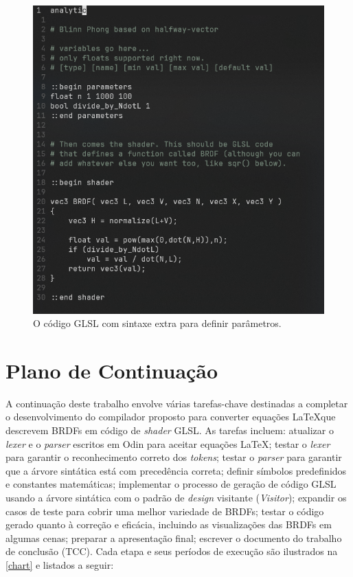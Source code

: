 \documentclass[english, 
               brazil, 
               bsc] %
               {dcomp-abntex2}
\begin{document}
\begin{figure}[h]
        \caption{\label{fig-disney-code} \small O código GLSL com sintaxe extra para definir parâmetros.}
        \begin{center}
            \includegraphics[scale=0.7]{./Imagens/disney-brdf-code.png}
        \end{center}
\end{figure}






\section{Plano de Continuação} \label{continuacao}


A continuação deste trabalho envolve várias tarefas-chave destinadas a completar o desenvolvimento do compilador proposto para converter equações \LaTeX  que descrevem BRDFs em código de \textit{shader} GLSL. As tarefas incluem: atualizar o \textit{lexer} e o \textit{parser} escritos em Odin para aceitar equações \LaTeX; testar o \textit{lexer} para garantir o reconhecimento correto dos \textit{tokens}; testar o \textit{parser} para garantir que a árvore sintática está com precedência correta; definir símbolos predefinidos e constantes matemáticas; implementar o processo de geração de código GLSL usando a árvore sintática com o padrão de \textit{design} visitante (\textit{Visitor}); expandir os casos de teste para cobrir uma melhor variedade de BRDFs; testar o código gerado quanto à correção e eficácia, incluindo as visualizações das BRDFs em algumas cenas; preparar a apresentação final; escrever o documento do trabalho de conclusão (TCC). Cada etapa e seus períodos de execução são ilustrados na \autoref{chart} e listados a seguir:
\end{document}
